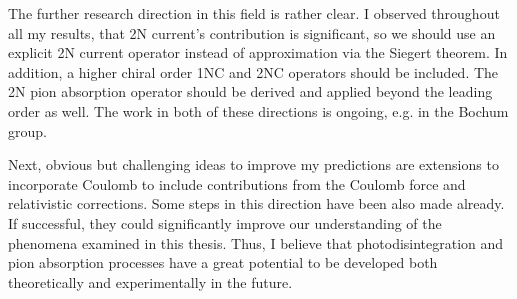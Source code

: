 The further research direction in this field is rather clear. I observed throughout all my results, that
2N current's contribution is significant, so we should use an explicit 2N current operator instead of approximation 
via the Siegert theorem.
In addition, a higher chiral order 1NC and 2NC operators should be included. The 2N pion absorption operator should be derived and applied beyond the leading order as well.
The work in both of these directions is ongoing, e.g. in the Bochum group.

Next, obvious but challenging ideas to improve my predictions are extensions to incorporate Coulomb to include contributions from the Coulomb force 
and relativistic corrections. Some steps in this direction have been also made already.
If successful, they could significantly improve our understanding of the phenomena examined in this thesis.
Thus, I believe that photodisintegration and pion absorption processes have a great potential to be developed both theoretically and experimentally in the future.
